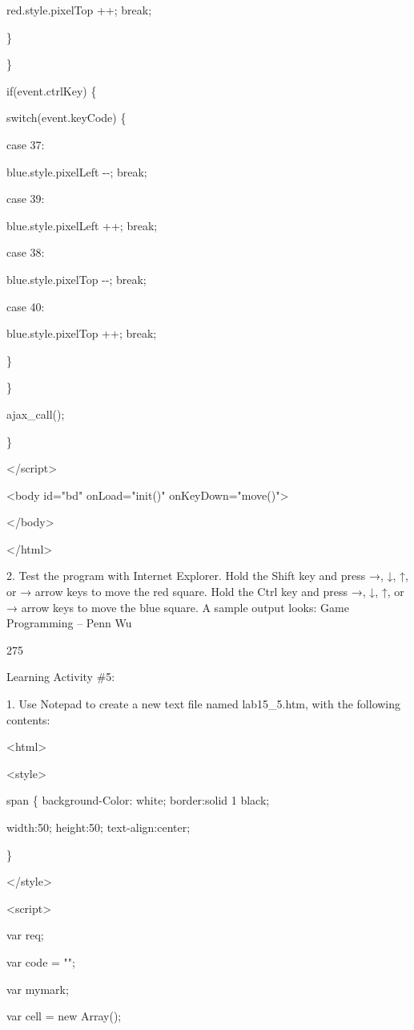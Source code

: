 \documentclass[
]{article}
\begin{document}
red.style.pixelTop ++; break;

\}

\}

if(event.ctrlKey) \{

switch(event.keyCode) \{

case 37:

blue.style.pixelLeft -\/-; break;

case 39:

blue.style.pixelLeft ++; break;

case 38:

blue.style.pixelTop -\/-; break;

case 40:

blue.style.pixelTop ++; break;

\}

\}

ajax\_call();

\}

\textless/script\textgreater{}

\textless body id="bd" onLoad="init()" onKeyDown="move()"\textgreater{}

\textless/body\textgreater{}

\textless/html\textgreater{}

2. Test the program with Internet Explorer. Hold the Shift key and press
→, ↓, ↑, or → arrow keys to move the red square. Hold the Ctrl key and
press →, ↓, ↑, or → arrow keys to move the blue square. A sample output
looks: Game Programming -- Penn Wu

275

\protect\hypertarget{index_split_014.htmlux5cux23p276}{}{}Learning
Activity \#5:

1. Use Notepad to create a new text file named lab15\_5.htm, with the
following contents:

\textless html\textgreater{}

\textless style\textgreater{}

span \{ background-Color: white; border:solid 1 black;

width:50; height:50; text-align:center;

\}

\textless/style\textgreater{}

\textless script\textgreater{}

var req;

var code = "";

var mymark;

var cell = new Array();
\end{document}

